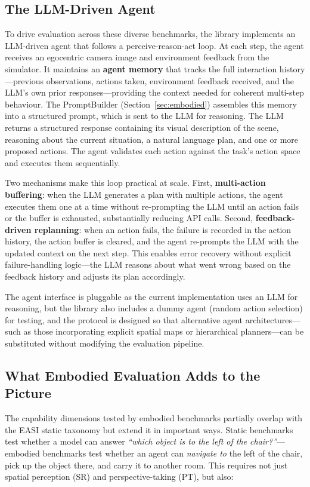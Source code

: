 \documentclass[
hf,
]{confart}
\begin{document}
\subsection{The LLM-Driven Agent}

To drive evaluation across these diverse benchmarks, the library implements an LLM-driven agent that follows a perceive-reason-act loop. At each step, the agent receives an egocentric camera image and environment feedback from the simulator. It maintains an \textbf{agent memory} that tracks the full interaction history---previous observations, actions taken, environment feedback received, and the LLM's own prior responses---providing the context needed for coherent multi-step behaviour. The PromptBuilder (Section~\ref{sec:embodied}) assembles this memory into a structured prompt, which is sent to the LLM for reasoning. The LLM returns a structured response containing its visual description of the scene, reasoning about the current situation, a natural language plan, and one or more proposed actions. The agent validates each action against the task's action space and executes them sequentially.

Two mechanisms make this loop practical at scale. First, \textbf{multi-action buffering}: when the LLM generates a plan with multiple actions, the agent executes them one at a time without re-prompting the LLM until an action fails or the buffer is exhausted, substantially reducing API calls. Second, \textbf{feedback-driven replanning}: when an action fails, the failure is recorded in the action history, the action buffer is cleared, and the agent re-prompts the LLM with the updated context on the next step. This enables error recovery without explicit failure-handling logic---the LLM reasons about what went wrong based on the feedback history and adjusts its plan accordingly.

The agent interface is pluggable as the current implementation uses an LLM for reasoning, but the library also includes a dummy agent (random action selection) for testing, and the protocol is designed so that alternative agent architectures---such as those incorporating explicit spatial maps or hierarchical planners---can be substituted without modifying the evaluation pipeline.

\subsection{What Embodied Evaluation Adds to the Picture}

The capability dimensions tested by embodied benchmarks partially overlap with the EASI static taxonomy but extend it in important ways. Static benchmarks test whether a model can answer \textit{``which object is to the left of the chair?''}---embodied benchmarks test whether an agent can \textit{navigate to} the left of the chair, pick up the object there, and carry it to another room. This requires not just spatial perception (SR) and perspective-taking (PT), but also:
\end{document}
